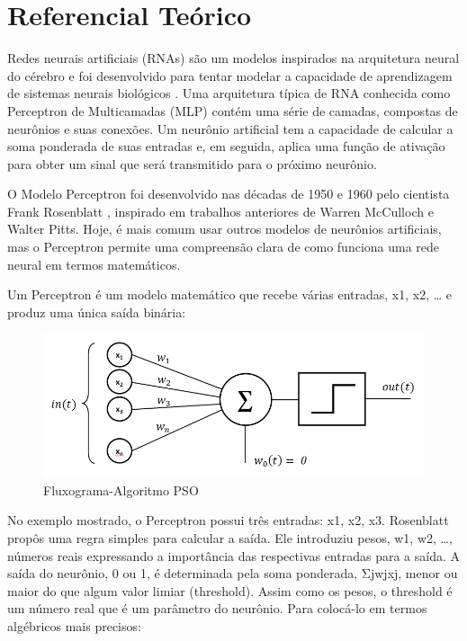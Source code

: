 \documentclass[conference]{IEEEtran}
\begin{document}
\section{Referencial Teórico}
	
	Redes neurais artificiais (RNAs) são um modelos inspirados na arquitetura neural do cérebro e foi desenvolvido para tentar modelar a capacidade de aprendizagem de sistemas neurais biológicos \cite{b4}. Uma arquitetura típica de RNA conhecida como Perceptron de Multicamadas (MLP) contém uma série de camadas, compostas de neurônios e suas conexões. Um neurônio artificial tem a capacidade de calcular a soma ponderada de suas entradas e, em seguida, aplica uma função de ativação para obter um sinal que será transmitido para o próximo neurônio.
	
	O Modelo Perceptron foi desenvolvido nas décadas de 1950 e 1960 pelo cientista Frank Rosenblatt \cite{b9}, inspirado em trabalhos anteriores de Warren McCulloch e Walter Pitts. Hoje, é mais comum usar outros modelos de neurônios artificiais, mas o Perceptron permite uma compreensão clara de como funciona uma rede neural em termos matemáticos.
	
	Um Perceptron é um modelo matemático que recebe várias entradas, x1, x2, … e produz uma única saída binária:
	
	\begin{figure}[htbp]
	\centerline{\includegraphics[scale=0.4]{Perceptron.png}}
	\caption{Fluxograma-Algoritmo PSO}
	\label{fig}
	\end{figure}
	
	No exemplo mostrado, o Perceptron possui três entradas: x1, x2, x3. Rosenblatt propôs uma regra simples para calcular a saída. Ele introduziu pesos, w1, w2, …, números reais expressando a importância das respectivas entradas para a saída. A saída do neurônio, 0 ou 1, é determinada pela soma ponderada, Σjwjxj, menor ou maior do que algum valor limiar (threshold). Assim como os pesos, o threshold é um número real que é um parâmetro do neurônio. Para colocá-lo em termos algébricos mais precisos:
\end{document}
